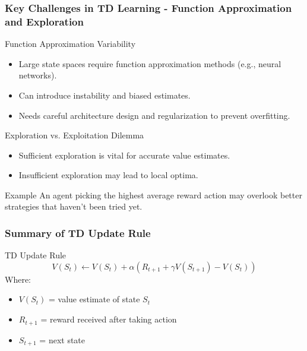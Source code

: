 \documentclass[aspectratio=169]{beamer}
\begin{document}
\begin{frame}[fragile]
    \frametitle{Key Challenges in TD Learning - Function Approximation and Exploration}
    \begin{block}{Function Approximation Variability}
        \begin{itemize}
            \item Large state spaces require function approximation methods (e.g., neural networks).
            \item Can introduce instability and biased estimates.
            \item Needs careful architecture design and regularization to prevent overfitting.
        \end{itemize}
    \end{block}

    \begin{block}{Exploration vs. Exploitation Dilemma}
        \begin{itemize}
            \item Sufficient exploration is vital for accurate value estimates.
            \item Insufficient exploration may lead to local optima.
        \end{itemize}
    \end{block}
    
    \begin{exampleblock}{Example}
        An agent picking the highest average reward action may overlook better strategies that haven't been tried yet.
    \end{exampleblock}
\end{frame}

\begin{frame}[fragile]
    \frametitle{Summary of TD Update Rule}
    \begin{block}{TD Update Rule}
        \begin{equation}
            V(S_t) \leftarrow V(S_t) + \alpha \left( R_{t+1} + \gamma V(S_{t+1}) - V(S_t) \right)
        \end{equation}
        Where:
        \begin{itemize}
            \item $V(S_t)$ = value estimate of state $S_t$
            \item $R_{t+1}$ = reward received after taking action
            \item $S_{t+1}$ = next state
        \end{itemize}
    \end{block}
\end{frame}
\end{document}
